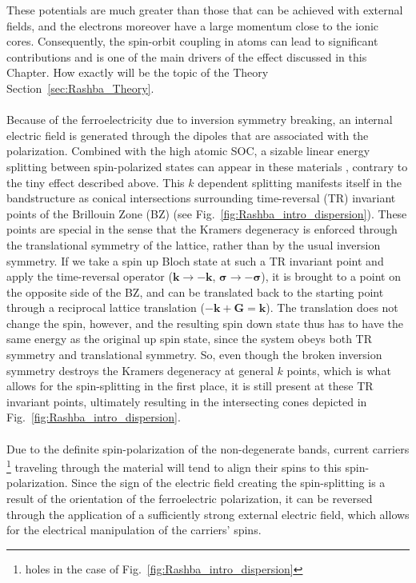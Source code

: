These potentials are much greater than those that can be achieved with external fields, and the electrons moreover have a large momentum close to the ionic cores.
Consequently, the spin-orbit coupling in atoms can lead to significant contributions and is one of the main drivers of the effect discussed in this Chapter.
How exactly will be the topic of the Theory Section~\ref{sec:Rashba_Theory}.
\\\\
Because of the ferroelectricity due to inversion symmetry breaking, an internal electric field is generated through the dipoles that are associated with the polarization.
Combined with the high atomic SOC, a sizable linear energy splitting between spin-polarized states can appear in these materials \cite{DiSante2013}, contrary to the tiny effect described above.
This $k$ dependent splitting manifests itself in the bandstructure as conical intersections surrounding time-reversal (TR) invariant points of the Brillouin Zone (BZ) (see Fig.~\ref{fig:Rashba_intro_dispersion}).
These points are special in the sense that the Kramers degeneracy \cite{Kramerstheorem} is enforced through the translational symmetry of the lattice, rather than by the usual inversion symmetry.
If we take a spin up Bloch state at such a TR invariant point and apply the time-reversal operator ($\bm k \rightarrow \bm {-k}$, $\bm{\sigma} \rightarrow -\bm{\sigma}$), it is brought to a point on the opposite side of the BZ, and can be translated back to the starting point through a reciprocal lattice translation ($-\bm k + \bm G = \bm k$). The translation does not change the spin, however, and the resulting spin down state thus has to have the same energy as the original up spin state, since the system obeys both TR symmetry and translational symmetry.
So, even though the broken inversion symmetry destroys the Kramers degeneracy at general $k$ points, which is what allows for the spin-splitting in the first place, it is still present at these TR invariant points, ultimately resulting in the intersecting cones depicted in Fig.~\ref{fig:Rashba_intro_dispersion}.
\\\\
Due to the definite spin-polarization of the non-degenerate bands, current carriers \footnote{holes in the case of Fig.~\ref{fig:Rashba_intro_dispersion}} traveling through the material will tend to align their spins to this spin-polarization.
Since the sign of the electric field creating the spin-splitting is a result of the orientation of the ferroelectric polarization, it can be reversed through the application of a sufficiently strong external electric field, which allows for the electrical manipulation of the carriers' spins.
